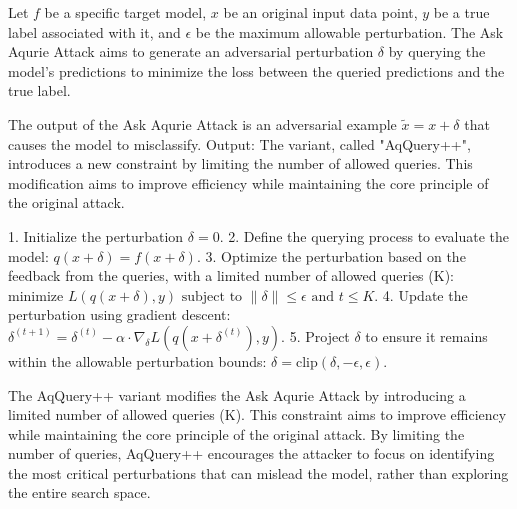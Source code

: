 Let \( f \) be a specific target model, \( x \) be an original input data point, \( y \) be a true label associated with it, and \( \epsilon \) be the maximum allowable perturbation. The Ask Aqurie Attack aims to generate an adversarial perturbation \( \delta \) by querying the model's predictions to minimize the loss between the queried predictions and the true label.

The output of the Ask Aqurie Attack is an adversarial example \( \tilde{x} = x + \delta \) that causes the model to misclassify.
Output: The variant, called "AqQuery++", introduces a new constraint by limiting the number of allowed queries. This modification aims to improve efficiency while maintaining the core principle of the original attack.

1. Initialize the perturbation \( \delta = 0 \).
2. Define the querying process to evaluate the model:
   $
   q(x + \delta) = f(x + \delta).
   $
3. Optimize the perturbation based on the feedback from the queries, with a limited number of allowed queries (K):
   $
   \text{minimize } L(q(x + \delta), y) \text{ subject to } \|\delta\| \leq \epsilon \text{ and } t \leq K.
   $
4. Update the perturbation using gradient descent:
   $
   \delta^{(t+1)} = \delta^{(t)} - \alpha \cdot \nabla_{\delta} L(q(x + \delta^{(t)}), y).
   $
5. Project \( \delta \) to ensure it remains within the allowable perturbation bounds:
   $
   \delta = \text{clip}(\delta, -\epsilon, \epsilon).
   $

The AqQuery++ variant modifies the Ask Aqurie Attack by introducing a limited number of allowed queries (K). This constraint aims to improve efficiency while maintaining the core principle of the original attack. By limiting the number of queries, AqQuery++ encourages the attacker to focus on identifying the most critical perturbations that can mislead the model, rather than exploring the entire search space.